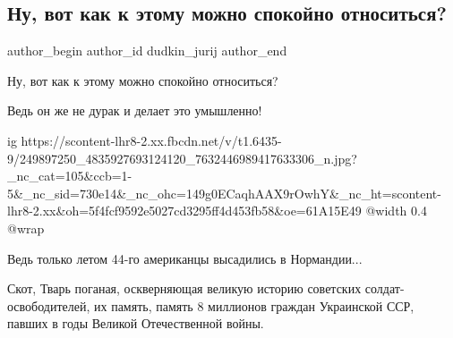  
 
 
 
 
 
\subsection{Ну, вот как к этому можно спокойно относиться?}
\label{sec:28_10_2021.fb.dudkin_jurij.1.shmygal_vranje_osvobozhdenie_ukrainy}
 
\ifcmt
 author_begin
   author_id dudkin_jurij
 author_end
\fi

Ну, вот как к этому можно спокойно относиться?

Ведь он же не дурак и делает это умышленно!

\ifcmt
  ig https://scontent-lhr8-2.xx.fbcdn.net/v/t1.6435-9/249897250_4835927693124120_7632446989417633306_n.jpg?_nc_cat=105&ccb=1-5&_nc_sid=730e14&_nc_ohc=149g0ECaqhAAX9rOwhY&_nc_ht=scontent-lhr8-2.xx&oh=5f4fcf9592e5027cd3295ff4d453fb58&oe=61A15E49
  @width 0.4
  @wrap 
\fi

Ведь только летом 44-го американцы высадились в Нормандии...

Скот, Тварь поганая, оскверняющая великую историю советских
солдат-освободителей, их память, память 8 миллионов граждан Украинской ССР,
павших в годы Великой Отечественной войны.

